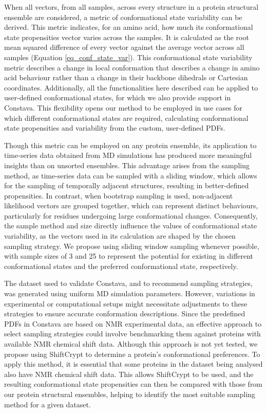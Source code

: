 When all vectors, from all samples, across every structure in a protein structural ensemble are considered, a metric of conformational state variability can be derived. This metric indicates, for an amino acid, how much its conformational state propensities vector varies across the samples. It is calculated as the root mean squared difference of every vector against the average vector across all samples (Equation \ref{eq_conf_state_var}). This conformational state variability metric describes a change in local conformation that describes a change in amino acid behaviour rather than a change in their backbone dihedrals or Cartesian coordinates. Additionally, all the functionalities here described can be applied to user-defined conformational states, for which we also provide support in Constava. This flexibility opens our method to be employed in use cases for which different conformational states are required, calculating conformational state propensities and variability from the custom, user-defined PDFs.

Though this metric can be employed on any protein ensemble, its application to time-series data obtained from MD simulations has produced more meaningful insights than on unsorted ensembles. This advantage arises from the sampling method, as time-series data can be sampled with a sliding window, which allows for the sampling of temporally adjacent structures, resulting in better-defined propensities. In contrast, when bootstrap sampling is used, non-adjacent likelihood vectors are grouped together, which can represent distinct behaviours, particularly for residues undergoing large conformational changes. Consequently, the sample method and size directly influence the values of conformational state variability, as the vectors used in its calculation are shaped by the chosen sampling strategy. We propose using sliding window sampling whenever possible, with sample sizes of 3 and 25 to represent the potential for existing in different conformational states and the preferred conformational state, respectively.

The dataset used to validate Constava, and to recommend sampling strategies, was generated using uniform MD simulation parameters. However, variations in experimental or computational setups might necessitate adjustments to these strategies to ensure accurate conformation descriptions. Since the predefined PDFs in Constava are based on NMR experimental data, an effective approach to select sampling strategies could involve benchmarking them against proteins with available NMR chemical shift data. Although this approach is not yet tested, we propose using ShiftCrypt \cite{orlando_shiftcrypt_2020} to determine a protein's conformational preferences. To apply this method, it is essential that some proteins in the dataset being analysed also have NMR chemical shift data. This allows ShiftCrypt to be used, and the resulting conformational state propensities can then be compared with those from our protein structural ensembles, helping to identify the most suitable sampling method for a given dataset.

